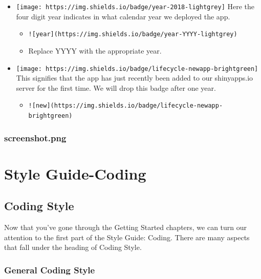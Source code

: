 \documentclass[
]{book}
\providecommand{\tightlist}{%
  \setlength{\itemsep}{0pt}\setlength{\parskip}{0pt}}
\begin{document}
\begin{itemize}
\tightlist
\item
  \texttt{[image: https://img.shields.io/badge/year-2018-lightgrey]} Here the four digit year indicates in what calendar year we deployed the app.

  \begin{itemize}
  \tightlist
  \item
    \texttt{!{[}year{]}(https://img.shields.io/badge/year-YYYY-lightgrey)}
  \item
    Replace YYYY with the appropriate year.
  \end{itemize}
\item
  \texttt{[image: https://img.shields.io/badge/lifecycle-newapp-brightgreen]} This signifies that the app has just recently been added to our shinyapps.io server for the first time. We will drop this badge after one year.

  \begin{itemize}
  \tightlist
  \item
    \texttt{!{[}new{]}(https://img.shields.io/badge/lifecycle-newapp-brightgreen)}
  \end{itemize}
\end{itemize}

\hypertarget{screenshot}{%
\section{screenshot.png}\label{screenshot}}

\hypertarget{part-style-guide-coding}{%
\part{Style Guide-Coding}\label{part-style-guide-coding}}

\hypertarget{coding}{%
\chapter{Coding Style}\label{coding}}

Now that you've gone through the Getting Started chapters, we can turn our attention to the first part of the Style Guide: Coding. There are many aspects that fall under the heading of Coding Style.

\hypertarget{genCode}{%
\section{General Coding Style}\label{genCode}}
\end{document}
